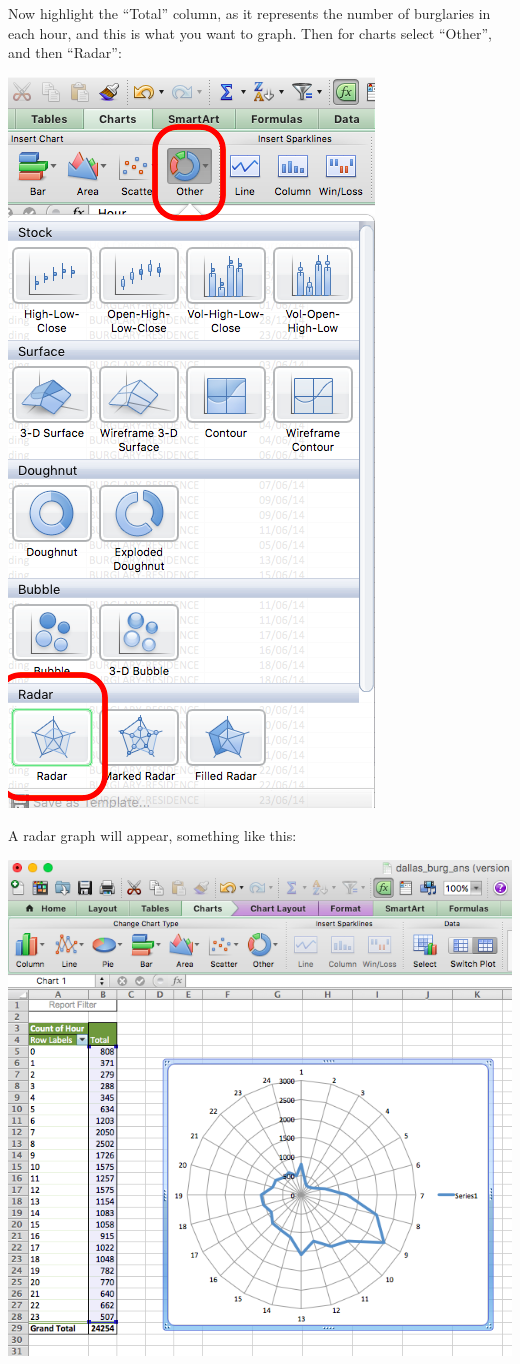 \documentclass[]{book}
\theoremstyle{definition}
\theoremstyle{definition}
\theoremstyle{definition}
\theoremstyle{remark}
\begin{document}
Now highlight the ``Total'' column, as it represents the number of
burglaries in each hour, and this is what you want to graph. Then for
charts select ``Other'', and then ``Radar'':

\includegraphics{imgs/hr_radar_1.png}

A radar graph will appear, something like this:

\includegraphics{imgs/wrong_radar.png}
\end{document}

